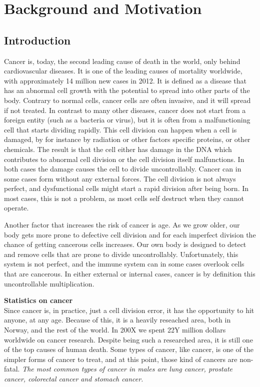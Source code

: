 \section{Background and Motivation}

\subsection{Introduction}
Cancer is, today, the second leading cause of death in the world, only behind cardiovascular diseases.  %
It is one of the leading causes of mortality worldwide, with approximately 14 million new cases in 2012.\cite{WHOCANCER}
It is defined as a disease that has an abnormal cell growth with the potential to spread into other parts of the body.\cite{WhatIsCancer}
Contrary to normal cells, cancer cells are often invasive, and it will spread if not treated. 
In contrast to many other diseases, cancer does not start from a foreign entity (such as a bacteria or virus), but it is often from a malfunctioning cell that starts dividing rapidly. 
This cell division can happen when a cell is damaged, by for instance by radiation or other factors specific proteins, or other chemicals. The result is that the cell either has damage in the DNA which contributes to abnormal cell division or the cell division itself malfunctions. In both cases the damage causes the cell to divide uncontrollably. 
Cancer can in some cases form without any external forces. The cell division is not always perfect, and dysfunctional cells might start a rapid division after being born. In most cases, this is not a problem, as most cells self destruct when they cannot operate. 

Another factor that increases the risk of cancer is age. As we grow older, our body gets more prone to defective cell division and for each imperfect division the chance of getting cancerous cells increases.  
Our own body is designed to detect and remove cells that are prone to divide uncontrollably. Unfortunately, this system is not perfect, and the immune system can in some cases overlook cells that are cancerous.
In either external or internal cases, cancer is by definition this uncontrollable multiplication.




\textbf{Statistics on cancer}\\
Since cancer is, in practice, just a cell division error, it has the opportunity to hit anyone, at any age. Because of this, it is a heavily reseached area, both in Norway, and the rest of the world.
In 200X we spent 22Y million dollars worldwide on cancer research. 
Despite being such a researched area, it is still one of the top causes of human death. 
Some types of cancer, like \todo{} cancer, is one of the simpler forms of cancer to treat, and at this point, those kind of cancers are non-fatal. 
\textit{The most common types of cancer in males are lung cancer, prostate cancer, colorectal cancer and stomach cancer.\cite{stewart2014world}}
    

